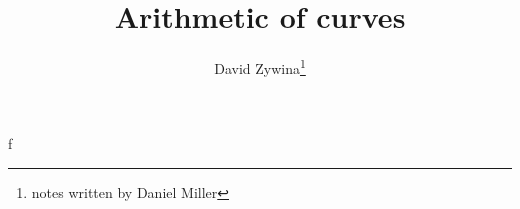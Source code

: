 \documentclass{article}
\title{Arithmetic of curves}
\author{David Zywina\thanks{notes written by Daniel Miller}}
\begin{document}
\maketitle





f
\end{document}
